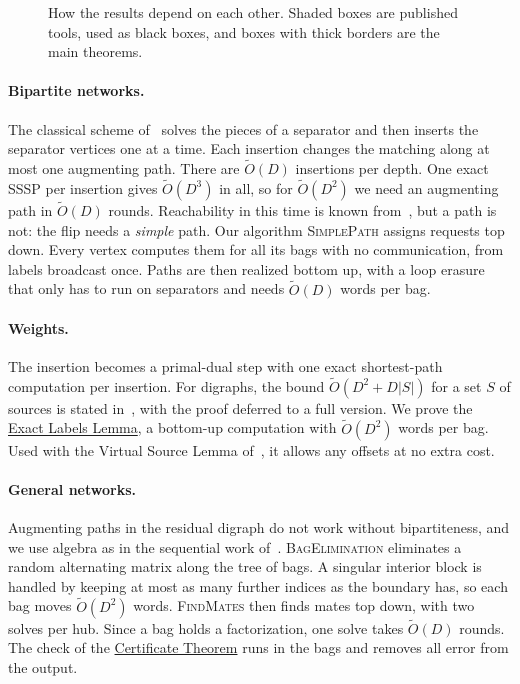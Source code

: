 \documentclass[11pt]{article}
\theoremstyle{definition}
\theoremstyle{remark}
\theoremstyle{plain}
\newcommand{\ThmCert}{\hyperref[thm:cert]{Certificate Theorem}}
\newcommand{\LemLabels}{\hyperref[lem:labels]{Exact Labels Lemma}}
\newcommand{\AlgPath}{\textsc{SimplePath}}
\newcommand{\AlgElim}{\textsc{BagElimination}}
\newcommand{\AlgMates}{\textsc{FindMates}}
\newcommand{\Ot}{\tilde O}
\begin{document}
\begin{figure}[t]
\centering

\caption{How the results depend on each other. Shaded boxes are published tools, used as black boxes, and
boxes with thick borders are the main theorems.}
\label{fig:overview}
\end{figure}

\paragraph{Bipartite networks.} The classical scheme of~\cite{LT80} solves the pieces of a separator
and then inserts the separator vertices one at a time. Each insertion changes the matching along at
most one augmenting path. There are $\Ot(D)$ insertions per depth. One exact SSSP per insertion gives $\Ot(D^3)$ in all, so for
$\Ot(D^2)$ we need an augmenting path in $\Ot(D)$ rounds. Reachability in this time is known from~\cite{P20}, but a path is not: the flip needs a
\emph{simple} path. Our algorithm \AlgPath{} assigns requests top down. Every vertex computes them
for all its bags with no communication, from labels broadcast once. Paths are then realized bottom up,
with a loop erasure that only has to run on separators and needs $\Ot(D)$ words per bag.

\paragraph{Weights.} The insertion becomes a primal-dual step with one exact shortest-path
computation per insertion. For digraphs, the bound $\Ot(D^2+D|S|)$ for a set $S$ of sources is stated in~\cite[Lemma 4]{P20}, with the proof deferred
to a full version. We prove the \LemLabels{}, a bottom-up computation with $\Ot(D^2)$ words per bag. Used with the Virtual
Source Lemma of~\cite{S26}, it allows any offsets at no extra cost.

\paragraph{General networks.} Augmenting paths in the residual digraph do not work without
bipartiteness, and we use algebra as in the sequential work of~\cite{MS06,FLPSW18}. \AlgElim{} eliminates a random alternating
matrix along the tree of bags. A singular interior block is handled by keeping at most as many further
indices as the boundary has, so each bag moves $\Ot(D^2)$ words. \AlgMates{} then finds mates top
down, with two solves per hub. Since a bag holds a factorization, one solve takes $\Ot(D)$ rounds. The check of the \ThmCert{} runs in the bags and
removes all error from the output.
\end{document}
